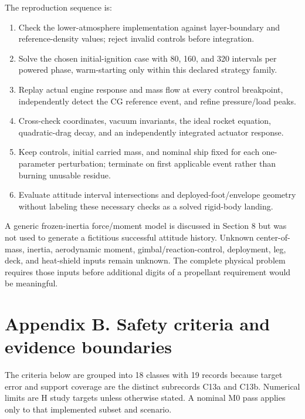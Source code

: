 \documentclass[
  11pt,
  a4paper,
]{article}
\providecommand{\tightlist}{%
  \setlength{\itemsep}{0pt}\setlength{\parskip}{0pt}}
\begin{document}
The reproduction sequence is:

\begin{enumerate}
\def\labelenumi{\arabic{enumi}.}
\tightlist
\item
  Check the lower-atmosphere implementation against layer-boundary and
  reference-density values; reject invalid controls before integration.
\item
  Solve the chosen initial-ignition case with 80, 160, and 320 intervals
  per powered phase, warm-starting only within this declared strategy
  family.
\item
  Replay actual engine response and mass flow at every control
  breakpoint, independently detect the CG reference event, and refine
  pressure/load peaks.
\item
  Cross-check coordinates, vacuum invariants, the ideal rocket equation,
  quadratic-drag decay, and an independently integrated actuator
  response.
\item
  Keep controls, initial carried mass, and nominal ship fixed for each
  one-parameter perturbation; terminate on first applicable event rather
  than burning unusable residue.
\item
  Evaluate attitude interval intersections and deployed-foot/envelope
  geometry without labeling these necessary checks as a solved
  rigid-body landing.
\end{enumerate}

A generic frozen-inertia force/moment model is discussed in Section 8
but was not used to generate a fictitious successful attitude history.
Unknown center-of-mass, inertia, aerodynamic moment,
gimbal/reaction-control, deployment, leg, deck, and heat-shield inputs
remain unknown. The complete physical problem requires those inputs
before additional digits of a propellant requirement would be
meaningful.

\section*{Appendix B. Safety criteria and evidence
boundaries}\label{appendix-b.-safety-criteria-and-evidence-boundaries}

The criteria below are grouped into 18 classes with 19 records because
target error and support coverage are the distinct subrecords C13a and
C13b. Numerical limits are H study targets unless otherwise stated. A
nominal M0 pass applies only to that implemented subset and scenario.
\end{document}
